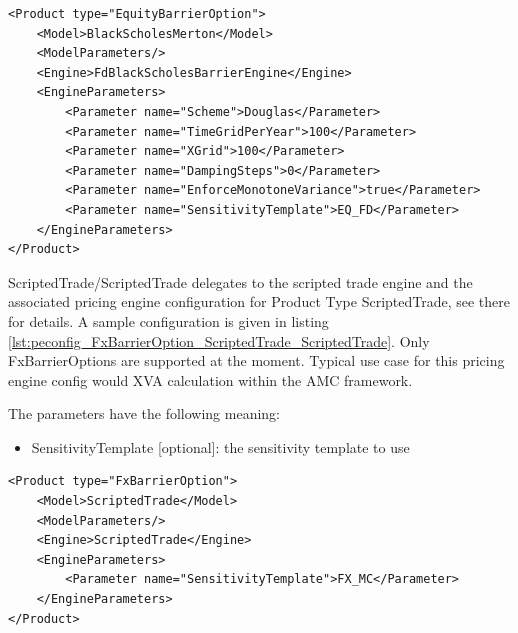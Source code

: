 \begin{longlisting}
\begin{verbatim}
<Product type="EquityBarrierOption">
    <Model>BlackScholesMerton</Model>
    <ModelParameters/>
    <Engine>FdBlackScholesBarrierEngine</Engine>
    <EngineParameters>
        <Parameter name="Scheme">Douglas</Parameter>
        <Parameter name="TimeGridPerYear">100</Parameter>
        <Parameter name="XGrid">100</Parameter>
        <Parameter name="DampingSteps">0</Parameter>
        <Parameter name="EnforceMonotoneVariance">true</Parameter>
        <Parameter name="SensitivityTemplate">EQ_FD</Parameter>
    </EngineParameters>
</Product>
\end{verbatim}
\caption{Configuration for Product EquityBarrierOption, Model BlackScholesMerton, Engine FdBlackScholesBarrierEngine}
\label{lst:peconfig_EquityBarrierOption_BlackScholesMerton_FdBlackScholesBarrierEngine}
\end{longlisting}

ScriptedTrade/ScriptedTrade delegates to the scripted trade engine and the associated pricing engine configuration for
Product Type ScriptedTrade, see there for details. A sample configuration is given in listing
\ref{lst:peconfig_FxBarrierOption_ScriptedTrade_ScriptedTrade}. Only FxBarrierOptions are supported at the moment.
Typical use case for this pricing engine config would XVA calculation within the AMC framework.

The parameters have the following meaning:

\begin{itemize}
\item SensitivityTemplate [optional]: the sensitivity template to use
\end{itemize}

\begin{longlisting}
\begin{verbatim}
<Product type="FxBarrierOption">
    <Model>ScriptedTrade</Model>
    <ModelParameters/>
    <Engine>ScriptedTrade</Engine>
    <EngineParameters>
        <Parameter name="SensitivityTemplate">FX_MC</Parameter>
    </EngineParameters>
</Product>
\end{verbatim}
\caption{Configuration for Product FxBarrierOption, Model ScriptedTrade, Engine ScriptedTrade}
\label{lst:peconfig_FxBarrierOption_ScriptedTrade_ScriptedTrade}
\end{longlisting}

